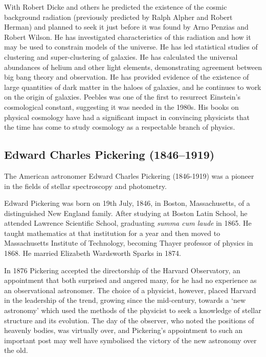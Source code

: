 With Robert Dicke and others he predicted the existence of the cosmic background radiation (previously predicted by Ralph Alpher and Robert Herman) and planned to seek it just before it was found by Arno Penzias and Robert Wilson. He has investigated characteristics of this radiation and how it may be used to constrain models of the universe. He has led statistical studies of clustering and super-clustering of galaxies. He has calculated the universal abundances of helium and other light elements, demonstrating agreement between big bang theory and observation. He has provided evidence of the existence of large quantities of dark matter in the haloes of galaxies, and he continues to work on the origin of galaxies. Peebles was one of the first to resurrect Einstein's cosmological constant, suggesting it was needed in the 1980s. His books on physical cosmology have had a significant impact in convincing physicists that the time has come to study cosmology as a respectable branch of physics.

\subsection[Edward \scshape{Pickering}]{Edward Charles Pickering (1846--1919)}\label{bio:pickering}
The American astronomer Edward Charles Pickering (1846-1919) was a pioneer in the fields of stellar spectroscopy and photometry.

Edward Pickering was born on 19th July, 1846, in Boston, Massachusetts, of a distinguished New England family. After studying at Boston Latin School, he attended Lawrence Scientific School, graduating \textit{summa cum laude} in 1865. He taught mathematics at that institution for a year and then moved to Massachusetts Institute of Technology, becoming Thayer professor of physics in 1868. He married Elizabeth Wardsworth Sparks in 1874.

In 1876 Pickering accepted the directorship of the Harvard Observatory, an appointment that both surprised and angered many, for he had no experience as an observational astronomer. The choice of a physicist, however, placed Harvard in the leadership of the trend, growing since the mid-century, towards a ‘new astronomy’ which used the methods of the physicist to seek a knowledge of stellar structure and its evolution. The day of the observer, who noted the positions of heavenly bodies, was virtually over, and Pickering's appointment to such an important post may well have symbolised the victory of the new astronomy over the old.

